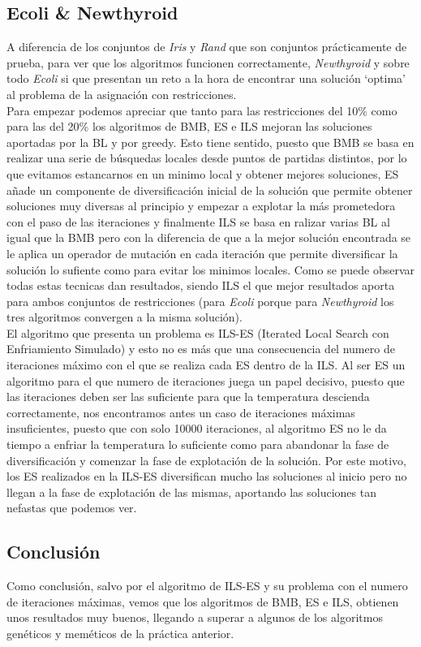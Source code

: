 \subsection{Ecoli \& Newthyroid}
A diferencia de los conjuntos de \emph{Iris} y \emph{Rand} que son conjuntos prácticamente de prueba, para ver que los algoritmos funcionen correctamente,
\emph{Newthyroid} y sobre todo \emph{Ecoli} si que presentan un reto a la hora de encontrar una solución `optima' al problema de la asignación con restricciones.\\
Para empezar podemos apreciar que tanto para las restricciones del 10\% como para las del 20\% los algoritmos de BMB, ES e ILS mejoran las soluciones aportadas por la BL y por greedy. Esto tiene sentido, puesto que BMB se basa en realizar una serie de búsquedas locales desde puntos de partidas distintos, por lo que evitamos estancarnos en un minimo local y obtener mejores soluciones, ES añade un componente de diversificación inicial de la solución que permite obtener soluciones muy diversas al principio y empezar a explotar la más prometedora con el paso de las iteraciones y finalmente ILS se basa en ralizar varias BL al igual que la BMB pero con la diferencia de que a la mejor solución encontrada se le aplica un operador de mutación en cada iteración que permite diversificar la solución lo sufiente como para evitar los minimos locales. Como se puede observar todas estas tecnicas dan resultados, siendo ILS el que mejor resultados aporta para ambos conjuntos de restricciones (para \emph{Ecoli} porque para \emph{Newthyroid} los tres algoritmos convergen a la misma solución).
\\
El algoritmo que presenta un problema es ILS-ES (Iterated Local Search con Enfriamiento Simulado) y esto no es más que una consecuencia del numero de iteraciones máximo con el que se realiza cada ES dentro de la ILS. Al ser ES un algoritmo para el que numero de iteraciones juega un papel decisivo, puesto que las iteraciones deben ser las suficiente para que la temperatura descienda correctamente, nos encontramos antes un caso de iteraciones máximas insuficientes, puesto que con solo 10000 iteraciones, al algoritmo ES no le da tiempo a enfriar la temperatura lo suficiente como para abandonar la fase de diversificación y comenzar la fase de explotación de la solución. Por este motivo, los ES realizados en la ILS-ES diversifican mucho las soluciones al inicio pero no llegan a la fase de explotación de las mismas, aportando las soluciones tan nefastas que podemos ver.


\subsection{Conclusión}
Como conclusión, salvo por el algoritmo de ILS-ES y su problema con el numero de iteraciones máximas, vemos que los algoritmos de BMB, ES e ILS, obtienen unos resultados muy buenos, llegando a superar a algunos de los algoritmos genéticos y meméticos de la práctica anterior.

